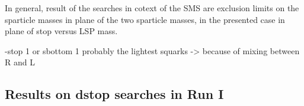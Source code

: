 In general, result of the searches in cotext of the SMS are exclusion limits on the sparticle masses in plane of the two sparticle masses, in the presented case in plane of  stop versus LSP mass.



-stop 1 or sbottom 1 probably the lightest squarks  -> because of mixing between R and L 


\subsection{Results on dstop searches in Run I}



